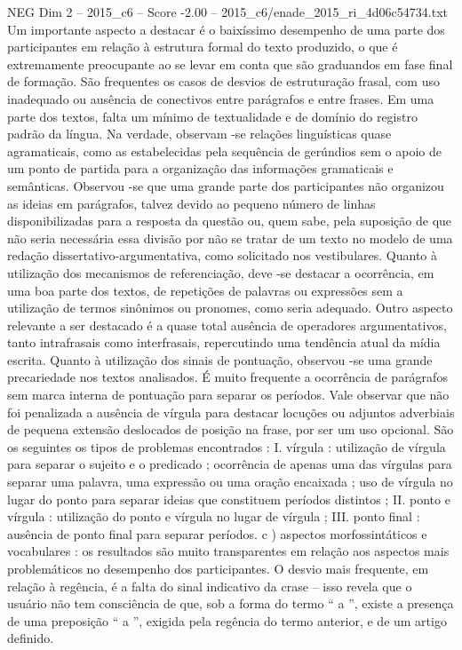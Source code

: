 \begin{textsample}{NEG Dim 2 – 2015\_c6 – Score -2.00 – 2015\_c6/enade\_2015\_ri\_4d06c54734.txt}
Um importante aspecto a destacar é o baixíssimo desempenho de uma parte dos participantes em relação à estrutura formal do texto produzido, o que é extremamente preocupante ao se levar em conta que são graduandos em fase final de formação.
São frequentes os casos de desvios de estruturação frasal, com uso inadequado ou ausência de conectivos entre parágrafos e entre frases.
Em uma parte dos textos, falta um mínimo de textualidade e de domínio do registro padrão da língua.
Na verdade, observam -se relações linguísticas quase agramaticais, como as estabelecidas pela sequência de gerúndios sem o apoio de um ponto de partida para a organização das informações gramaticais e semânticas.
Observou -se que uma grande parte dos participantes não organizou as ideias em parágrafos, talvez devido ao pequeno número de linhas disponibilizadas para a resposta da questão ou, quem sabe, pela suposição de que não seria necessária essa divisão por não se tratar de um texto no modelo de uma redação dissertativo-argumentativa, como solicitado nos vestibulares.
Quanto à utilização dos mecanismos de referenciação, deve -se destacar a ocorrência, em uma boa parte dos textos, de repetições de palavras ou expressões sem a utilização de termos sinônimos ou pronomes, como seria adequado.
Outro aspecto relevante a ser destacado é a quase total ausência de operadores argumentativos, tanto intrafrasais como interfrasais, repercutindo uma tendência atual da mídia escrita.
Quanto à utilização dos sinais de pontuação, observou -se uma grande precariedade nos textos analisados.
É muito frequente a ocorrência de parágrafos sem marca interna de pontuação para separar os períodos.
Vale observar que não foi penalizada a ausência de vírgula para destacar locuções ou adjuntos adverbiais de pequena extensão deslocados de posição na frase, por ser um uso opcional.
São os seguintes os tipos de problemas encontrados : I. vírgula : utilização de vírgula para separar o sujeito e o predicado ; ocorrência de apenas uma das vírgulas para separar uma palavra, uma expressão ou uma oração encaixada ; uso de vírgula no lugar do ponto para separar ideias que constituem períodos distintos ; II. ponto e vírgula : utilização do ponto e vírgula no lugar de vírgula ; III. ponto final : ausência de ponto final para separar períodos. c ) aspectos morfossintáticos e vocabulares : os resultados são muito transparentes em relação aos aspectos mais problemáticos no desempenho dos participantes.
O desvio mais frequente, em relação à regência, é a falta do sinal indicativo da crase – isso revela que o usuário não tem consciência de que, sob a forma do termo “ a ”, existe a presença de uma preposição “ a ”, exigida pela regência do termo anterior, e de um artigo definido.

\end{textsample}
